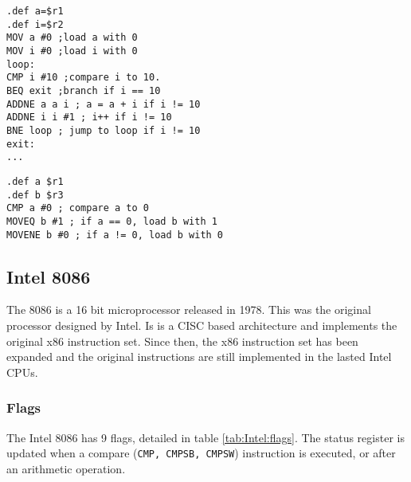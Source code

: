 \documentclass[12pt,a4paper]{article}
\begin{document}
\begin{bibunit}[is-unsrt]
\begin{lstlisting}[frame=single,caption=Thumb/Thumb2 Assembler for code in listing \ref{ListC},label=ARM1]
.def a=$r1
.def i=$r2
MOV a #0 ;load a with 0
MOV i #0 ;load i with 0
loop:
CMP i #10 ;compare i to 10.
BEQ exit ;branch if i == 10
ADDNE a a i ; a = a + i if i != 10
ADDNE i i #1 ; i++ if i != 10
BNE loop ; jump to loop if i != 10
exit: 
...
\end{lstlisting}


\begin{lstlisting}[frame=single,caption=Thumb/Thumb2 Assembler for code in listing \ref{ListC2},label=ARM2]
.def a $r1
.def b $r3
CMP a #0 ; compare a to 0
MOVEQ b #1 ; if a == 0, load b with 1
MOVENE b #0 ; if a != 0, load b with 0
\end{lstlisting}


\subsection{Intel 8086}

The 8086 is a 16 bit microprocessor released in 1978.
This was the original processor designed by Intel.
Is is a CISC based architecture and implements the original x86 instruction set.
Since then, the x86 instruction set has been expanded and the original instructions are still implemented in the lasted Intel CPUs.

\subsubsection{Flags}

The Intel 8086 has 9 flags, detailed in table \ref{tab:Intel:flags}.
The status register is updated when a compare (\texttt{CMP, CMPSB, CMPSW}) instruction is executed, or after an arithmetic operation.



\end{bibunit}
\end{document}
